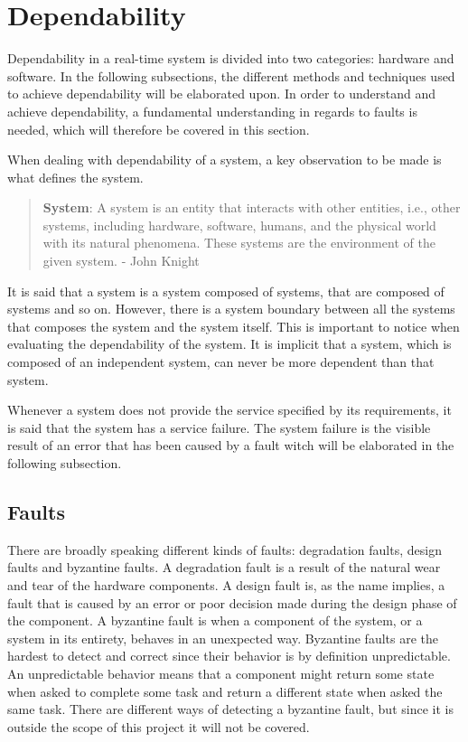 \section{Dependability}
Dependability in a real-time system is divided into two categories: hardware and software. 
In the following subsections, the different methods and techniques used to achieve dependability will be elaborated upon.  
In order to understand and achieve dependability, a fundamental understanding in regards to faults is needed, which will therefore be covered in this section.

When dealing with dependability of a system, a key observation to be made is what defines the system. 
\begin{quote}
\textbf{System}: A system is an entity that interacts with other entities, i.e., other systems, including hardware, software, humans, and the physical world with its natural phenomena.
These systems are the environment of the given system. 
- John Knight \cite{FundementalsOfDependableComputingForSoftwareEngineers}
\end{quote}
It is said that a system is a system composed of systems, that are composed of systems and so on. 
However, there is a system boundary between all the systems that composes the system and the system itself. 
This is important to notice when evaluating the dependability of the system. 
It is implicit that a system, which is composed of an independent system, can never be more dependent than that system. 

Whenever a system does not provide the service specified by its requirements, it is said that the system has a service failure. 
The system failure is the visible result of an error that has been caused by a fault witch will be elaborated in the following subsection.

\subsection{Faults}
There are broadly speaking different kinds of faults: degradation faults, design faults and byzantine faults. 
A degradation fault is a result of the natural wear and tear of the hardware components.
A design fault is, as the name implies, a fault that is caused by an error or poor decision made during the design phase of the component. 
A byzantine fault is when a component of the system, or a system in its entirety, behaves in an unexpected way. 
Byzantine faults are the hardest to detect and correct since their behavior is by definition unpredictable. 
An unpredictable behavior means that a component might return some state when asked to complete some task and return a different state when asked the same task. 
There are different ways of detecting a byzantine fault, but since it is outside the scope of this project it will not be covered. 

